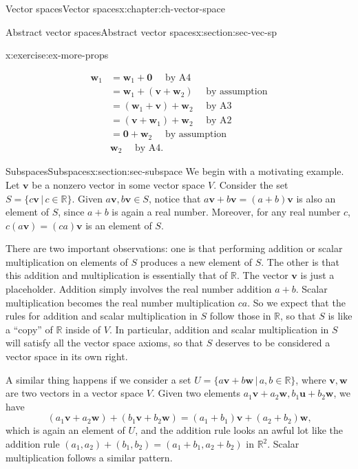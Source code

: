 \documentclass[oneside,10pt,]{book}
\numberwithin{equation}{section}
\newcommand{\R}{\mathbb{R}}
\newcommand{\uu}{\mathbf{u}}
\newcommand{\vv}{\mathbf{v}}
\newcommand{\ww}{\mathbf{w}}
\newcommand{\zer}{\mathbf{0}}
\newcommand{\amp}{&}
\begin{document}
\begin{chapterptx}{Vector spaces}{}{Vector spaces}{}{}{x:chapter:ch-vector-space}
\begin{sectionptx}{Abstract vector spaces}{}{Abstract vector spaces}{}{}{x:section:sec-vec-sp}
\begin{inlineexercise}{}{x:exercise:ex-more-props}
\begin{enumerate}
\begin{align*}
\ww_1 \amp = \ww_1+\zer \quad  \text{ by A4}\\
\amp = \ww_1+(\vv+\ww_2) \quad \text{ by assumption}\\
\amp = (\ww_1+\vv)+\ww_2 \quad \text{ by A3}\\
\amp = (\vv+\ww_1)+\ww_2 \quad \text{ by A2}\\
\amp = \zer+\ww_2 \quad \text{ by assumption}\\
\amp \ww_2 \quad \text{ by A4}\text{.}
\end{align*}
%
\end{enumerate}
%
\end{inlineexercise}%
\end{sectionptx}
%
%
\typeout{************************************************}
\typeout{************************************************}
%
\begin{sectionptx}{Subspaces}{}{Subspaces}{}{}{x:section:sec-subspace}
We begin with a motivating example. Let \(\vv\) be a nonzero vector in some vector space \(V\). Consider the set \(S = \{c\vv\,|\, c\in \R\}\). Given \(a\vv,b\vv\in S\), notice that \(a\vv+b\vv=(a+b)\vv\) is also an element of \(S\), since \(a+b\) is again a real number. Moreover, for any real number \(c\), \(c(a\vv)=(ca)\vv\) is an element of \(S\).%
\par
There are two important observations: one is that performing addition or scalar multiplication on elements of \(S\) produces a new element of \(S\). The other is that this addition and multiplication is essentially that of \(\R\). The vector \(\vv\) is just a placeholder. Addition simply involves the real number addition \(a+b\). Scalar multiplication becomes the real number multiplication \(ca\). So we expect that the rules for addition and scalar multiplication in \(S\) follow those in \(\R\), so that \(S\) is like a ``copy'' of \(\R\) inside of \(V\). In particular, addition and scalar multiplication in \(S\) will satisfy all the vector space axioms, so that \(S\) deserves to be considered a vector space in its own right.%
\par
A similar thing happens if we consider a set \(U=\{a\vv+b\ww\,|\, a,b\in\R\}\), where \(\vv,\ww\) are two vectors in a vector space \(V\). Given two elements \(a_1\vv+a_2\ww,b_1\uu+b_2\ww\), we have%
\begin{equation*}
(a_1\vv+a_2\ww)+(b_1\vv+b_2\ww) = (a_1+b_1)\vv+(a_2+b_2)\ww\text{,}
\end{equation*}
which is again an element of \(U\), and the addition rule looks an awful lot like the addition rule \((a_1,a_2)+(b_1,b_2)=(a_1+b_1,a_2+b_2)\) in \(\R^2\). Scalar multiplication follows a similar pattern.%

\end{sectionptx}
\end{chapterptx}
\end{document}
